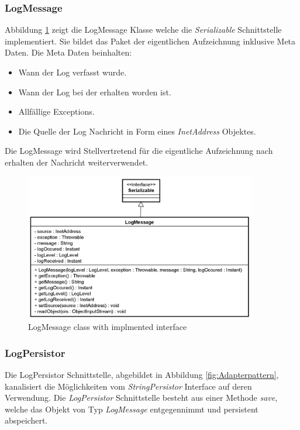 \subsubsection{LogMessage}

Abbildung \ref{fig:LogMessage} zeigt die LogMessage Klasse welche die \textit{Serializable} Schnittstelle implementiert. Sie bildet das Paket der eigentlichen Aufzeichnung inklusive Meta Daten. Die Meta Daten beinhalten:

\begin{itemize}
	\item Wann der Log verfasst wurde.
	\item Wann der Log bei der erhalten worden ist.
	\item Allfällige Exceptions.
	\item Die Quelle der Log Nachricht in Form eines \textit{InetAddress} Objektes.
\end{itemize}

Die LogMessage wird Stellvertretend für die eigentliche Aufzeichnung nach erhalten der Nachricht weiterverwendet.

\begin{figure}[H]
	\centering
	\includegraphics[width=0.9\textwidth]{3_Schnittstellen/Bilder/logMessage.png}
	\caption{LogMessage class with implmented interface}
	\label{fig:LogMessage}
\end{figure}

\subsubsection{LogPersistor}
Die LogPersistor Schnittstelle, abgebildet in Abbildung \ref{fig:Adapterpattern}, kanalisiert die Möglichkeiten vom \textit{StringPersistor} Interface auf deren Verwendung. Die \textit{LogPersistor} Schnittstelle besteht aus einer Methode \textit{save}, welche das Objekt von Typ \textit{LogMessage} entgegennimmt und persistent abspeichert.

